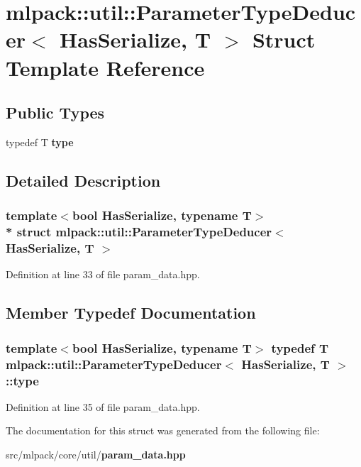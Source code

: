 \section{mlpack\+:\+:util\+:\+:Parameter\+Type\+Deducer$<$ Has\+Serialize, T $>$ Struct Template Reference}
\label{structmlpack_1_1util_1_1ParameterTypeDeducer}
\subsection*{Public Types}
\begin{DoxyCompactItemize}
\item 
typedef T {\bf type}
\end{DoxyCompactItemize}


\subsection{Detailed Description}
\subsubsection*{template$<$bool Has\+Serialize, typename T$>$\\*
struct mlpack\+::util\+::\+Parameter\+Type\+Deducer$<$ Has\+Serialize, T $>$}



Definition at line 33 of file param\+\_\+data.\+hpp.



\subsection{Member Typedef Documentation}
\subsubsection[{type}]{\setlength{\rightskip}{0pt plus 5cm}template$<$bool Has\+Serialize, typename T$>$ typedef T {\bf mlpack\+::util\+::\+Parameter\+Type\+Deducer}$<$ Has\+Serialize, T $>$\+::{\bf type}}\label{structmlpack_1_1util_1_1ParameterTypeDeducer_a3e80b341441e8061358ffb547a1c9efb}


Definition at line 35 of file param\+\_\+data.\+hpp.



The documentation for this struct was generated from the following file\+:\begin{DoxyCompactItemize}
\item 
src/mlpack/core/util/{\bf param\+\_\+data.\+hpp}\end{DoxyCompactItemize}
